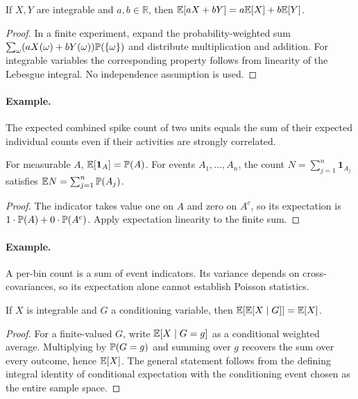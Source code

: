 \begin{proposition}If $X,Y$ are integrable and $a,b\in\mathbb R$, then $\mathbb E[aX+bY]=a\mathbb E[X]+b\mathbb E[Y]$.\end{proposition}
\begin{proof}In a finite experiment, expand the probability-weighted sum $\sum_\omega (aX(\omega)+bY(\omega))\mathbb P(\{\omega\})$ and distribute multiplication and addition. For integrable variables the corresponding property follows from linearity of the Lebesgue integral. No independence assumption is used.\end{proof}
\paragraph{Example.} The expected combined spike count of two units equals the sum of their expected individual counts even if their activities are strongly correlated.

\begin{proposition}For measurable $A$, $\mathbb E[\mathbf1_A]=\mathbb P(A)$. For events $A_1,\ldots,A_n$, the count $N=\sum_{j=1}^n\mathbf1_{A_j}$ satisfies $\mathbb E N=\sum_{j=1}^n\mathbb P(A_j)$.\end{proposition}
\begin{proof}The indicator takes value one on $A$ and zero on $A^c$, so its expectation is $1\cdot\mathbb P(A)+0\cdot\mathbb P(A^c)$. Apply expectation linearity to the finite sum.\end{proof}
\paragraph{Example.} A per-bin count is a sum of event indicators. Its variance depends on cross-covariances, so its expectation alone cannot establish Poisson statistics.

\begin{theorem}If $X$ is integrable and $G$ a conditioning variable, then $\mathbb E[\mathbb E[X\mid G]]=\mathbb E[X]$.\end{theorem}
\begin{proof}For a finite-valued $G$, write $\mathbb E[X\mid G=g]$ as a conditional weighted average. Multiplying by $\mathbb P(G=g)$ and summing over $g$ recovers the sum over every outcome, hence $\mathbb E[X]$. The general statement follows from the defining integral identity of conditional expectation with the conditioning event chosen as the entire sample space.\end{proof}
